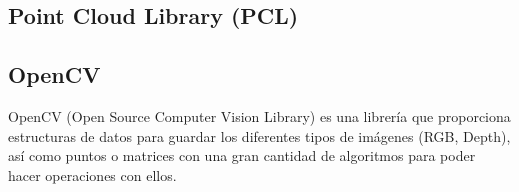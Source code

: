 \subsection{Point Cloud Library (PCL)}

\subsection{OpenCV}

OpenCV (Open Source Computer Vision Library) es una librería que proporciona estructuras de datos para guardar los diferentes tipos de imágenes (RGB, Depth), así como puntos o matrices con una gran cantidad de algoritmos para poder hacer operaciones con ellos.
